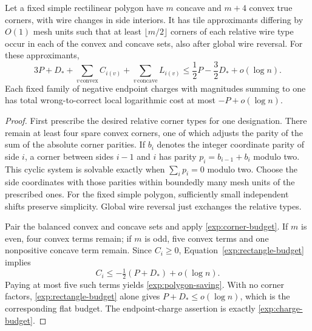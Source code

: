 \begin{corollary}\label{exp:polygon-budget}
Let a fixed simple rectilinear polygon have $m$ concave and $m+4$
convex true corners, with wire changes in side interiors. It has tile
approximants differing by $O(1)$ mesh units such that at least
$\lfloor m/2\rfloor$ corners of each relative wire type occur in each
of the convex and concave sets, also after global wire reversal.
For these approximants,
\begin{equation}\label{exp:polygon-saving}
 3P+D_*+\sum_{v\,\mathrm{convex}}C_{i(v)}
       +\sum_{v\,\mathrm{concave}}L_{i(v)}
 \le\frac12P-\frac32D_*+o(\log n).
\end{equation}
Each fixed family of negative endpoint charges with magnitudes summing
to one has total wrong-to-correct local logarithmic cost at most
$-P+o(\log n)$.
\end{corollary}

\begin{proof}
First prescribe the desired relative corner types for one designation.
There remain at least four spare convex corners, one of which adjusts
the parity of the sum of the absolute corner parities. If $b_i$ denotes
the integer coordinate parity of side $i$, a corner between sides
$i-1$ and $i$ has parity $p_i=b_{i-1}+b_i$ modulo two. This cyclic
system is solvable exactly when $\sum_i p_i=0$ modulo two. Choose the
side coordinates with those parities within boundedly many mesh units
of the prescribed ones. For the fixed simple polygon, sufficiently
small independent shifts preserve simplicity. Global wire reversal
just exchanges the relative types.

Pair the balanced convex and concave sets and apply
\eqref{exp:corner-budget}. If $m$ is even, four convex terms remain;
if $m$ is odd, five convex terms and one nonpositive concave term remain.
Since $C_i\ge0$, Equation~\eqref{exp:rectangle-budget} implies
\[
 C_i\le-\tfrac12(P+D_*)+o(\log n).
\]
Paying at most five such terms yields
\eqref{exp:polygon-saving}. With no corner factors,
\eqref{exp:rectangle-budget} alone gives
$P+D_*\le o(\log n)$, which is the corresponding flat budget.
The endpoint-charge assertion is exactly
\eqref{exp:charge-budget}.
\end{proof}
